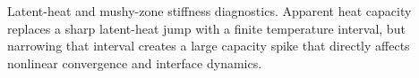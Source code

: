 \caption{Latent-heat and mushy-zone stiffness diagnostics. Apparent heat capacity replaces a sharp latent-heat jump with a finite temperature interval, but narrowing that interval creates a large capacity spike that directly affects nonlinear convergence and interface dynamics.}
\label{fig:direction-c-mushy-capacity}
